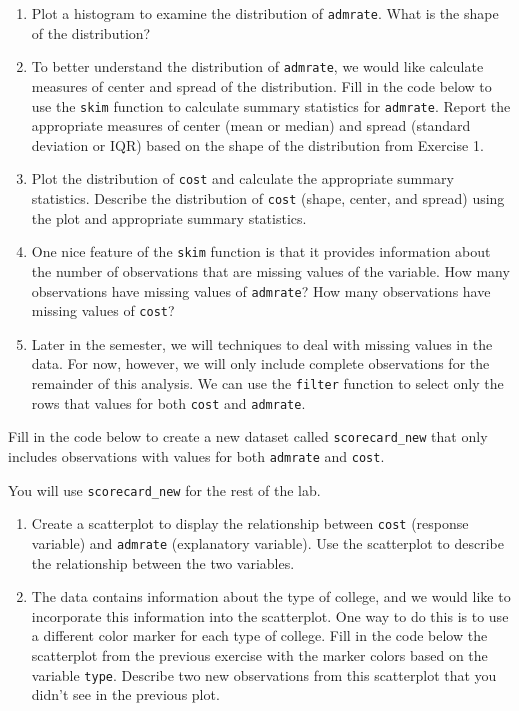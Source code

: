 \documentclass[]{book}
\begin{document}
\begin{enumerate}
\def\labelenumi{\arabic{enumi}.}
\item
  Plot a histogram to examine the distribution of \texttt{admrate}. What
  is the shape of the distribution?
\item
  To better understand the distribution of \texttt{admrate}, we would
  like calculate measures of center and spread of the distribution. Fill
  in the code below to use the \texttt{skim} function to calculate
  summary statistics for \texttt{admrate}. Report the appropriate
  measures of center (mean or median) and spread (standard deviation or
  IQR) based on the shape of the distribution from Exercise 1.
\item
  Plot the distribution of \texttt{cost} and calculate the appropriate
  summary statistics. Describe the distribution of \texttt{cost} (shape,
  center, and spread) using the plot and appropriate summary statistics.
\item
  One nice feature of the \texttt{skim} function is that it provides
  information about the number of observations that are missing values
  of the variable. How many observations have missing values of
  \texttt{admrate}? How many observations have missing values of
  \texttt{cost}?
\item
  Later in the semester, we will techniques to deal with missing values
  in the data. For now, however, we will only include complete
  observations for the remainder of this analysis. We can use the
  \texttt{filter} function to select only the rows that values for both
  \texttt{cost} and \texttt{admrate}.
\end{enumerate}

Fill in the code below to create a new dataset called
\texttt{scorecard\_new} that only includes observations with values for
both \texttt{admrate} and \texttt{cost}.

You will use \texttt{scorecard\_new} for the rest of the lab.

\begin{enumerate}
\def\labelenumi{\arabic{enumi}.}
\setcounter{enumi}{5}
\item
  Create a scatterplot to display the relationship between \texttt{cost}
  (response variable) and \texttt{admrate} (explanatory variable). Use
  the scatterplot to describe the relationship between the two
  variables.
\item
  The data contains information about the type of college, and we would
  like to incorporate this information into the scatterplot. One way to
  do this is to use a different color marker for each type of college.
  Fill in the code below the scatterplot from the previous exercise with
  the marker colors based on the variable \texttt{type}. Describe two
  new observations from this scatterplot that you didn't see in the
  previous plot.
\end{enumerate}
\end{document}
